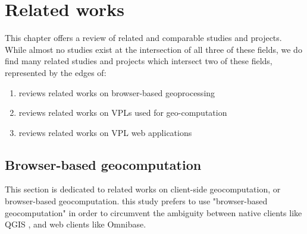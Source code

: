 \chapter{Related works}
\label{chap:related}

This chapter offers a review of related and comparable studies and projects.
While almost no studies exist at the intersection of all three of these fields, we do find many related studies and projects which intersect two of these fields, represented by the edges of:
\begin{enumerate}[-]
  \item {} reviews related works on browser-based geoprocessing
  \item {} reviews related works on VPLs used for geo-computation
  \item {} reviews related works on VPL web applications
\end{enumerate}


\section{Browser-based geocomputation}
\label{sec:related-geoweb}

This section is dedicated to related works on client-side geocomputation, or browser-based geocomputation. 
this study prefers to use "browser-based geocomputation" in order to circumvent the ambiguity between native clients like QGIS \cite{qgis_community_qgis_2022}, and web clients like Omnibase.


